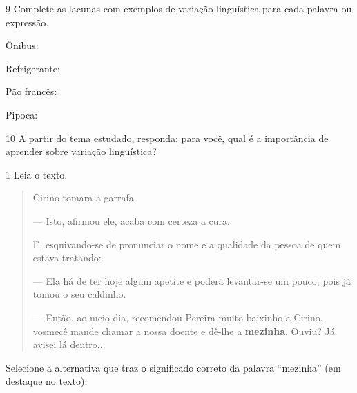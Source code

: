 
\pagebreak

\num{9} Complete as lacunas com exemplos de variação linguística para cada palavra ou expressão.

\begin{escolha}
\item Ônibus: 

\item Refrigerante: 

\item Pão francês:

\item Pipoca: 
\end{escolha}


\num{10} A partir do tema estudado, responda: para você, qual é a importância de
aprender sobre variação linguística?



\num{1} Leia o texto.

\begin{quote}
Cirino tomara a garrafa.

— Isto, afirmou ele, acaba com certeza a cura.

E, esquivando-se de pronunciar o nome e a qualidade da pessoa de quem
estava tratando:

— Ela há de ter hoje algum apetite e poderá levantar-se um pouco, pois
já tomou o seu caldinho.

— Então, ao meio-dia, recomendou Pereira muito baixinho a Cirino,
vosmecê mande chamar a nossa doente e dê-lhe a \textbf{mezinha}. Ouviu?
Já avisei lá dentro...

\end{quote}

\noindent{}Selecione a alternativa que traz o significado correto da palavra “mezinha” (em destaque no texto).

